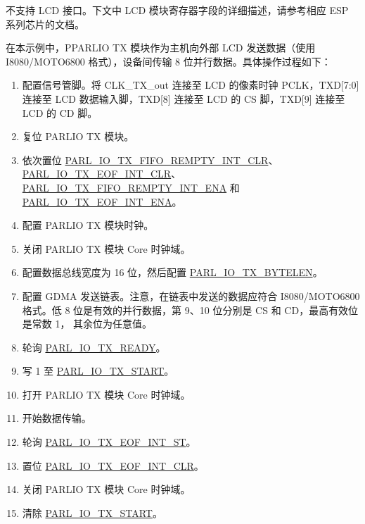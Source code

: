 \documentclass[main\_\_CN.tex]{subfiles}
\begin{document}
\vspace{1em}
\begin{tiplisting}
    \chipname{} 不支持 LCD 接口。下文中 LCD 模块寄存器字段的详细描述，请参考相应 ESP 系列芯片的文档。
\end{tiplisting}
\vspace{-1em}

在本示例中，PPARLIO TX 模块作为主机向外部 LCD 发送数据（使用 I8080/MOTO6800 格式），设备间传输 8 位并行数据。具体操作过程如下：

\begin{enumerate}
    \item 配置信号管脚。将 CLK\_TX\_out 连接至 LCD 的像素时钟 PCLK，TXD[7:0] 连接至 LCD 数据输入脚，TXD[8] 连接至 LCD 的 CS 脚，TXD[9] 连接至 LCD 的 CD 脚。
    \item 复位 PARLIO TX 模块。
    \item 依次置位 \hyperref[fielddesc:PARLIOTXFIFOREMPTYINTCLR]{PARL\_IO\_TX\_FIFO\_REMPTY\_INT\_CLR}、\hyperref[fielddesc:PARLIOTXEOFINTCLR]{PARL\_IO\_TX\_EOF\_INT\_CLR}、\hyperref[fielddesc:PARLIOTXFIFOREMPTYINTENA]{PARL\_IO\_TX\_FIFO\_REMPTY\_INT\_ENA} 和  \hyperref[fielddesc:PARLIOTXEOFINTENA]{PARL\_IO\_TX\_EOF\_INT\_ENA}。
    \item 配置 PARLIO TX 模块时钟。
    \item 关闭 PARLIO TX 模块 Core 时钟域。
    \item 配置数据总线宽度为 16 位，然后配置 \hyperref[fielddesc:PARLIOTXBYTELEN]{PARL\_IO\_TX\_BYTELEN}。 
    \item 配置 GDMA 发送链表。注意，在链表中发送的数据应符合 I8080/MOTO6800 格式。低 8 位是有效的并行数据，第 9、10 位分别是 CS 和 CD，最高有效位是常数 1， 其余位为任意值。
    \item 轮询 \hyperref[fielddesc:PARLIOTXREADY]{PARL\_IO\_TX\_READY}。    
    \item 写 1 至 \hyperref[fielddesc:PARLIOTXSTART]{PARL\_IO\_TX\_START}。
    \item 打开 PARLIO TX 模块 Core 时钟域。
    \item 开始数据传输。
    \item 轮询 \hyperref[fielddesc:PARLIOTXEOFINTST]{PARL\_IO\_TX\_EOF\_INT\_ST}。
    \item 置位 \hyperref[fielddesc:PARLIOTXEOFINTCLR]{PARL\_IO\_TX\_EOF\_INT\_CLR}。
    \item 关闭 PARLIO TX 模块 Core 时钟域。
    \item 清除 \hyperref[fielddesc:PARLIOTXSTART]{PARL\_IO\_TX\_START}。 
\end{enumerate}
\end{document}
